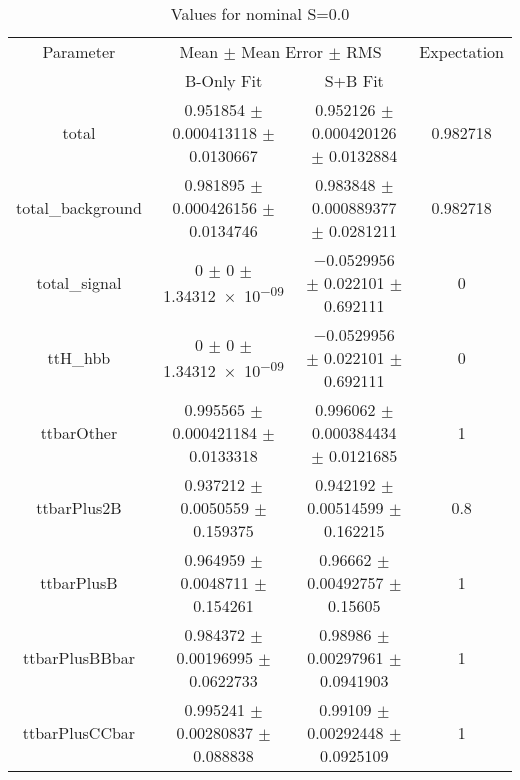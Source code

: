 \begin{table}
\centering
\caption{Values for nominal S=0.0}
\begin{tabular}{cccc}
\toprule
Parameter & \multicolumn{2}{c}{Mean $\pm$ Mean Error $\pm$ RMS} & Expectation\\
 & B-Only Fit & S+B Fit & \\
\midrule
total & \num{0.951854} $\pm$ \num{0.000413118} $\pm$ \num{0.0130667} & \num{0.952126} $\pm$ \num{0.000420126} $\pm$ \num{0.0132884} & \num{0.982718}\\
total\_background & \num{0.981895} $\pm$ \num{0.000426156} $\pm$ \num{0.0134746} & \num{0.983848} $\pm$ \num{0.000889377} $\pm$ \num{0.0281211} & \num{0.982718}\\
total\_signal & \num{0} $\pm$ \num{0} $\pm$ \num{1.34312e-09} & \num{-0.0529956} $\pm$ \num{0.022101} $\pm$ \num{0.692111} & \num{0}\\
ttH\_hbb & \num{0} $\pm$ \num{0} $\pm$ \num{1.34312e-09} & \num{-0.0529956} $\pm$ \num{0.022101} $\pm$ \num{0.692111} & \num{0}\\
ttbarOther & \num{0.995565} $\pm$ \num{0.000421184} $\pm$ \num{0.0133318} & \num{0.996062} $\pm$ \num{0.000384434} $\pm$ \num{0.0121685} & \num{1}\\
ttbarPlus2B & \num{0.937212} $\pm$ \num{0.0050559} $\pm$ \num{0.159375} & \num{0.942192} $\pm$ \num{0.00514599} $\pm$ \num{0.162215} & \num{0.8}\\
ttbarPlusB & \num{0.964959} $\pm$ \num{0.0048711} $\pm$ \num{0.154261} & \num{0.96662} $\pm$ \num{0.00492757} $\pm$ \num{0.15605} & \num{1}\\
ttbarPlusBBbar & \num{0.984372} $\pm$ \num{0.00196995} $\pm$ \num{0.0622733} & \num{0.98986} $\pm$ \num{0.00297961} $\pm$ \num{0.0941903} & \num{1}\\
ttbarPlusCCbar & \num{0.995241} $\pm$ \num{0.00280837} $\pm$ \num{0.088838} & \num{0.99109} $\pm$ \num{0.00292448} $\pm$ \num{0.0925109} & \num{1}\\
\bottomrule
\end{tabular}
\end{table}